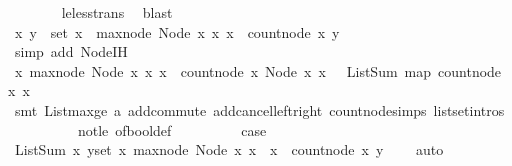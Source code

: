 \begin{isabellebody}
\ \ \ \ \ \ \isamarkupfalse%
\ le{\isacharunderscore}less{\isacharunderscore}trans\ \isamarkupfalse%
\ blast\ \ \isanewline
\ \ \ \ \isamarkupfalse%
\ \isamarkupfalse%
\ {\isachardoublequoteopen}{\isasymforall}x{\isachardot}\ {\isasymforall}y\ {\isasymin}\ set\ x{}\ {\isachardot}\ max{\isacharunderscore}node\ {\isacharparenleft}Node\ x{}\ x{}{\isacharparenright}{\isacharless}\ x\ {\isasymlongrightarrow}\ count{\isacharunderscore}node\ x\ y\ {\isacharequal}\ {}{\isachardoublequoteclose}\isanewline
\ \ \ \ \ \ \isamarkupfalse%
\ {\isacharparenleft}simp\ add{\isacharcolon}\ Node{\isachardot}IH{\isacharparenright}\isanewline
\ \ \ \ \isamarkupfalse%
\ \isamarkupfalse%
\ {\isachardoublequoteopen}{\isasymforall}x{\isachardot}\ max{\isacharunderscore}node\ {\isacharparenleft}Node\ x{}\ x{}{\isacharparenright}{\isacharless}\ x\ {\isasymlongrightarrow}\ count{\isacharunderscore}node\ x\ {\isacharparenleft}Node\ x{}\ x{}{\isacharparenright}\ {\isacharequal}\ \ ListSum\ {\isacharparenleft}map\ {\isacharparenleft}count{\isacharunderscore}node\ x{\isacharparenright}\ x{}{\isacharparenright}{\isachardoublequoteclose}\isanewline
\ \ \ \ \ \ \isamarkupfalse%
\ {\isacharparenleft}smt\ Listmax{\isacharunderscore}ge\ a\ add{\isachardot}commute\ add{\isacharunderscore}cancel{\isacharunderscore}left{\isacharunderscore}right\ count{\isacharunderscore}node{\isachardot}simps{\isacharparenleft}{}{\isacharparenright}\ list{\isachardot}set{\isacharunderscore}intros{\isacharparenleft}{}{\isacharparenright}\ \isanewline
\ \ \ \ \ \ \ \ \ \ not{\isacharunderscore}le\ of{\isacharunderscore}bool{\isacharunderscore}def{\isacharparenright}\isanewline
\ \ \ \ \ \ \isamarkupfalse%
\ \isamarkupfalse%
\ {\isacharquery}case\isanewline
\ \ \ \ \ \ \isamarkupfalse%
\ ListSum{\isacharunderscore}{}\ {\isacartoucheopen}{\isasymforall}x{\isachardot}\ {\isasymforall}y{\isasymin}set\ x{}{\isachardot}\ max{\isacharunderscore}node\ {\isacharparenleft}Node\ x{}\ x{}{\isacharparenright}\ {\isacharless}\ x\ {\isasymlongrightarrow}\ count{\isacharunderscore}node\ x\ y\ {\isacharequal}\ {}{\isacartoucheclose}\ \isamarkupfalse%
\ auto\ \isanewline
\ \ \isamarkupfalse%
%
\endisatagproof
{\isafoldproof}%
%
\isadelimproof

\end{isabellebody}
